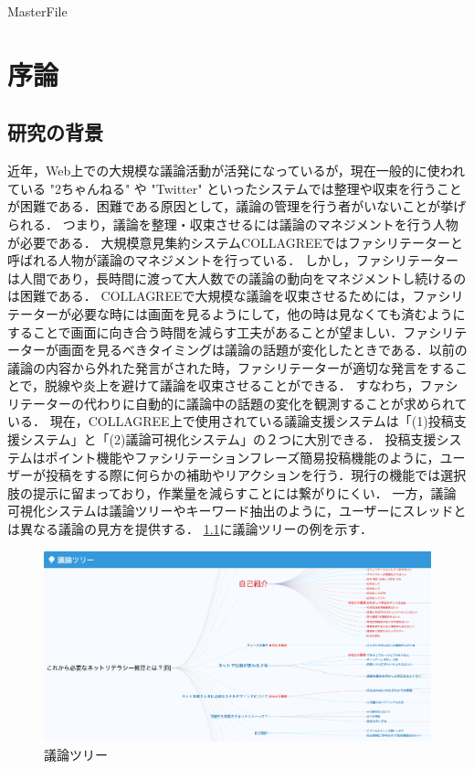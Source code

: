 \expandafter\ifx\csname MasterFile\endcsname\relax
	\def\SubFile{hoge}
	
	
	\setcounter{chapter}{0}
	\fi
\cleardoublepage
\chapter{序論}
\label{intro:chapter}
\section{研究の背景}
\label{intro:background}
近年，Web上での大規模な議論活動が活発になっているが，現在一般的に使われている "2ちゃんねる" や "Twitter" といったシステムでは整理や収束を行うことが困難である．困難である原因として，議論の管理を行う者がいないことが挙げられる．
つまり，議論を整理・収束させるには議論のマネジメントを行う人物が必要である．
%
大規模意見集約システムCOLLAGREE\cite{collagreeTest}ではファシリテーターと呼ばれる人物が議論のマネジメントを行っている．
しかし，ファシリテーターは人間であり，長時間に渡って大人数での議論の動向をマネジメントし続けるのは困難である．
COLLAGREEで大規模な議論を収束させるためには，ファシリテーターが必要な時には画面を見るようにして，他の時は見なくても済むようにすることで画面に向き合う時間を減らす工夫があることが望ましい．ファシリテーターが画面を見るべきタイミングは議論の話題が変化したときである．以前の議論の内容から外れた発言がされた時，ファシリテーターが適切な発言をすることで，脱線や炎上を避けて議論を収束させることができる．
すなわち，ファシリテーターの代わりに自動的に議論中の話題の変化を観測することが求められている．
%
現在，COLLAGREE上で使用されている議論支援システムは「(1)投稿支援システム」と「(2)議論可視化システム」の２つに大別できる．
投稿支援システムはポイント機能やファシリテーションフレーズ簡易投稿機能のように，ユーザーが投稿をする際に何らかの補助やリアクションを行う．現行の機能では選択肢の提示に留まっており，作業量を減らすことには繋がりにくい．
一方，議論可視化システムは議論ツリーやキーワード抽出のように，ユーザーにスレッドとは異なる議論の見方を提供する．
\ref{Fig:argTree1}に議論ツリーの例を示す．
\begin{figure}[htbp]
 \begin{center}
  \includegraphics[width=\textwidth]{../images/2.Related_Work/argTree1.png}
  \caption{議論ツリー}
  \label{Fig:argTree1}
  \vspace{-10pt}
 \end{center}
\end{figure}
